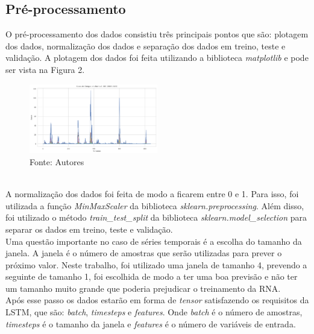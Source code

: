 \documentclass[
	article,			%
	11pt,				%
	a4paper,			%
	chapter=TITLE,		%
	section=TITLE,		%
	subsection=TITLE,	%
	subsubsection=TITLE %
	english,			%
	brazil,				%
	sumario=tradicional
	]{abntex2}
\begin{document}
\subsection{Pré-processamento}
O pré-processamento dos dados consistiu três principais pontos que são: plotagem dos dados, normalização dos dados e separação dos dados em treino, teste e validação. 
A plotagem dos dados foi feita utilizando a biblioteca \textit{matplotlib} e pode ser vista na Figura 2.
\begin{figure}[htbp]
	\centering
	\includegraphics[width=0.5\textwidth]{imagens/imgCodigos/casosTotaisBambui20082023.png}
	\caption{Fonte: Autores}
	\label{figure2}
\end{figure}
\\ \indent
A normalização dos dados foi feita de modo a ficarem entre 0 e 1. Para isso, foi utilizada a função \textit{MinMaxScaler} da biblioteca \textit{sklearn.preprocessing}. Além disso, foi utilizado o método \textit{train\_test\_split} da biblioteca \textit{sklearn.model\_selection} para separar os dados em treino, teste e validação.
\\ \indent
Uma questão importante no caso de séries temporais é a escolha do tamanho da janela. A janela é o número de amostras que serão utilizadas para prever o próximo valor. Neste trabalho, foi utilizado uma janela de tamanho 4, prevendo a seguinte de tamanho 1, foi escolhida de modo a ter uma boa previsão e não ter um tamanho muito grande que poderia prejudicar o treinamento da RNA.
\\ \indent 
Após esse passo os dados estarão em forma de \textit{tensor} satisfazendo os requisitos da LSTM, que são: \textit{batch}, \textit{timesteps} e \textit{features}. Onde \textit{batch} é o número de amostras, \textit{timesteps} é o tamanho da janela e \textit{features} é o número de variáveis de entrada. 
\end{document}
